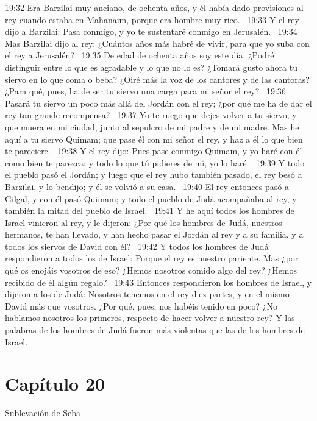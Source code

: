 19:32 Era Barzilai muy anciano, de ochenta años, y él había dado provisiones al rey cuando estaba en Mahanaim, porque era hombre muy rico.  
19:33 Y el rey dijo a Barzilai: Pasa conmigo, y yo te sustentaré conmigo en Jerusalén.  
19:34 Mas Barzilai dijo al rey: ¿Cuántos años más habré de vivir, para que yo suba con el rey a Jerusalén?  
19:35 De edad de ochenta años soy este día. ¿Podré distinguir entre lo que es agradable y lo que no lo es? ¿Tomará gusto ahora tu siervo en lo que coma o beba? ¿Oiré más la voz de los cantores y de las cantoras? ¿Para qué, pues, ha de ser tu siervo una carga para mi señor el rey?  
19:36 Pasará tu siervo un poco más allá del Jordán con el rey; ¿por qué me ha de dar el rey tan grande recompensa?  
19:37 Yo te ruego que dejes volver a tu siervo, y que muera en mi ciudad, junto al sepulcro de mi padre y de mi madre. Mas he aquí a tu siervo Quimam; que pase él con mi señor el rey, y haz a él lo que bien te pareciere.  
19:38 Y el rey dijo: Pues pase conmigo Quimam, y yo haré con él como bien te parezca; y todo lo que tú pidieres de mí, yo lo haré.  
19:39 Y todo el pueblo pasó el Jordán; y luego que el rey hubo también pasado, el rey besó a Barzilai, y lo bendijo; y él se volvió a su casa.  
19:40 El rey entonces pasó a Gilgal, y con él pasó Quimam; y todo el pueblo de Judá acompañaba al rey, y también la mitad del pueblo de Israel.  
19:41 Y he aquí todos los hombres de Israel vinieron al rey, y le dijeron: ¿Por qué los hombres de Judá, nuestros hermanos, te han llevado, y han hecho pasar el Jordán al rey y a su familia, y a todos los siervos de David con él?  
19:42 Y todos los hombres de Judá respondieron a todos los de Israel: Porque el rey es nuestro pariente. Mas ¿por qué os enojáis vosotros de eso? ¿Hemos nosotros comido algo del rey? ¿Hemos recibido de él algún regalo?  
19:43 Entonces respondieron los hombres de Israel, y dijeron a los de Judá: Nosotros tenemos en el rey diez partes, y en el mismo David más que vosotros. ¿Por qué, pues, nos habéis tenido en poco? ¿No hablamos nosotros los primeros, respecto de hacer volver a nuestro rey? Y las palabras de los hombres de Judá fueron más violentas que las de los hombres de Israel.  
\section*{Capítulo 20}
Sublevación de Seba  

